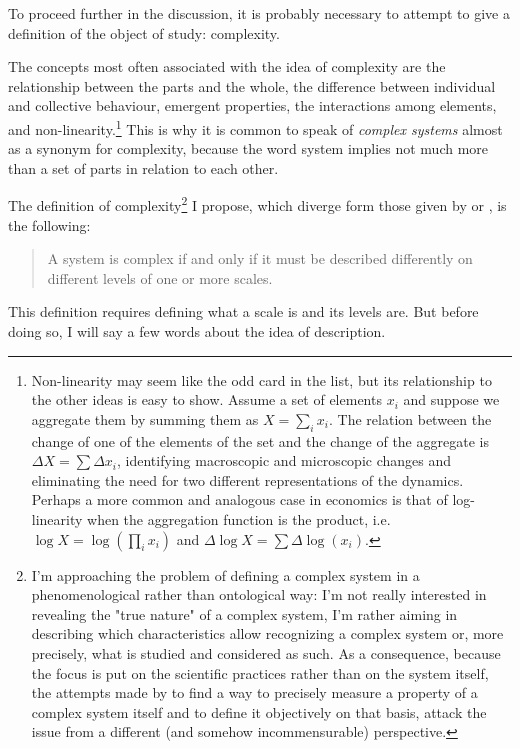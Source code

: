 To proceed further in the discussion, it is probably necessary to attempt to give a definition of the object of study: complexity.

The concepts most often associated with the idea of complexity are the relationship between the parts and the whole, the difference between individual and collective behaviour, emergent properties, the interactions among elements, and non-linearity.\footnote{Non-linearity may seem like the odd card in the list, but its relationship to the other ideas is easy to show. Assume a set of elements ${x_i}$ and suppose we aggregate them by summing them as $X=\sum_i x_i$. The relation between the change of one of the elements of the set and the change of the aggregate is $\Delta X=\sum \Delta x_i$, identifying macroscopic and microscopic changes and eliminating the need for two different representations of the dynamics. Perhaps a more common and analogous case in economics is that of log-linearity when the aggregation function is the product, i.e. $\log X = \log(\prod_i x_i)$ and $\Delta \log X=\sum \Delta\log(x_i)$.} This is why it is common to speak of \textit{complex systems} almost as a synonym for complexity, because the word system implies not much more than a set of parts in relation to each other.

The definition of complexity\footnote{I'm approaching the problem of defining a complex system in a phenomenological rather than ontological way: I'm not really interested in revealing the "true nature" of a complex system, I'm rather aiming in describing which characteristics allow recognizing a complex system or, more precisely, what is studied and considered as such. As a consequence, because the focus is put on the scientific practices rather than on the system itself, the attempts made by \textcite{wiesner2020} to find a way to precisely measure a property of a complex system itself and to define it objectively on that basis, attack the issue from a different (and somehow incommensurable) perspective.} I propose, which diverge form those given by \textcite[§3][]{holt2011} or \textcite{ladyman2020}, is the following:
\begin{quote}
	A system is complex if and only if it must be described differently on different levels of one or more scales.
\end{quote}

This definition requires defining what a scale is and its levels are. But before doing so, I will say a few words about the idea of description.

